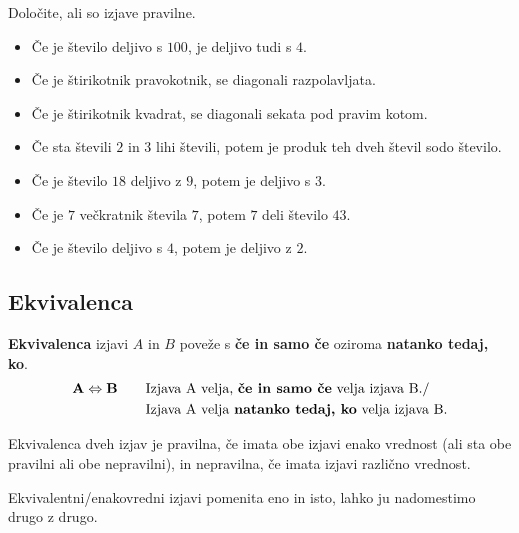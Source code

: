          

         
             \begin{naloga}
                Določite, ali so izjave pravilne.
                \begin{itemize}
                    \item Če je število deljivo s $100$, je deljivo tudi s $4$.
                    \item Če je štirikotnik pravokotnik, se diagonali razpolavljata.
                    \item Če je štirikotnik kvadrat, se diagonali sekata pod pravim kotom.
                    \item Če sta števili $2$ in $3$ lihi števili, potem je produk teh dveh števil sodo število.
                    \item Če je število $18$ deljivo z $9$, potem je deljivo s $3$.
                    \item Če je $7$ večkratnik števila $7$, potem $7$ deli število $43$.
                    \item Če je število deljivo s $4$, potem je deljivo z $2$.
                \end{itemize}
            \end{naloga}
         
         
             \subsection{Ekvivalenca}
                \textbf{Ekvivalenca} izjavi $A$ in $B$ poveže s \textbf{če in samo če} oziroma
                \textbf{natanko tedaj, ko}.
                \begin{align*} 
                    \mathbf{A\Leftrightarrow B} \quad \quad &\textmd{Izjava A velja, \textbf{če in
                    samo če} velja izjava B.} / \\
                        &\textmd{Izjava A velja \textbf{natanko tedaj, ko} velja izjava B.}
                \end{align*}
             


                      
                        Ekvivalenca dveh izjav je pravilna, če imata obe izjavi enako vrednost 
                        (ali sta obe pravilni ali obe nepravilni), in nepravilna, če imata izjavi
                        različno vrednost.
                     
                      
                        Ekvivalentni/enakovredni izjavi pomenita eno in isto, lahko ju nadomestimo 
                        drugo z drugo.
                     

